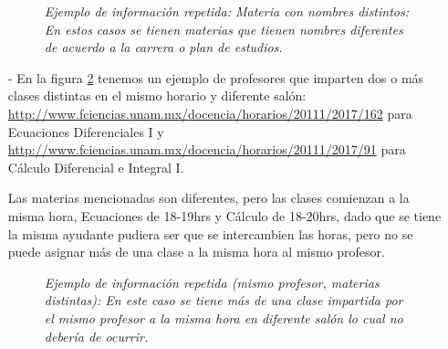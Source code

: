 \begin{itemize}
\begin{figure}[H]
	\centering
	\caption[\textit{Ejemplo de información repetida: Materia con nombres distintos}]{\textit{Ejemplo de información repetida: Materia con nombres distintos: En estos casos se tienen materias que tienen nombres diferentes de acuerdo a la carrera o plan de estudios.}}\label{MateriaNombresDistintos}
\end{figure}


\item[-] En la figura \ref{UnProfMuchasMaterias} tenemos un ejemplo de profesores que imparten dos o más clases distintas en el mismo horario y diferente salón: \url{http://www.fciencias.unam.mx/docencia/horarios/20111/2017/162} para Ecuaciones Diferenciales I y \url{http://www.fciencias.unam.mx/docencia/horarios/20111/2017/91} para Cálculo Diferencial e Integral I.
  
Las materias mencionadas son diferentes, pero las clases comienzan a la misma hora, Ecuaciones de 18-19hrs y Cálculo de 18-20hrs, dado que se tiene la misma ayudante pudiera ser que se intercambien las horas, pero no se puede asignar más de una clase a la misma hora al mismo profesor.

\begin{figure}[H]
	\centering
	\caption[\textit{Ejemplo de información repetida: Mismo profesor, materias distintas}]{\textit{Ejemplo de información repetida (mismo profesor, materias distintas): En este caso se tiene más de una clase impartida por el mismo profesor a la misma hora en diferente salón lo cual no debería de ocurrir.}}\label{UnProfMuchasMaterias}
\end{figure}	

\end{itemize}
